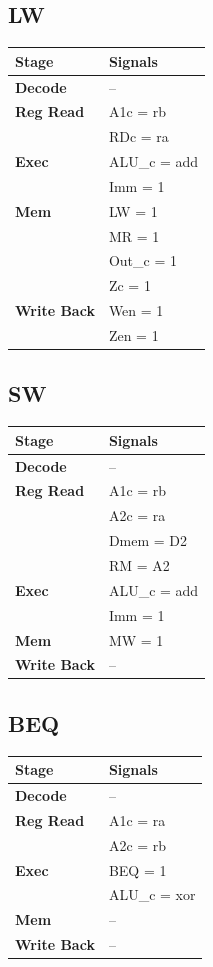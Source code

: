 \documentclass{article}
\begin{document}
\subsection*{LW}
\begin{tabular}{|l|l|}
\hline
\textbf{Stage} & \textbf{Signals}\\
\hline
\textbf{Decode} & --\\
\hline
\textbf{Reg Read} & A1c = rb\\
                  & RDc = ra\\
\hline
\textbf{Exec} & ALU\_c = add\\
              & Imm = 1\\
\hline
\textbf{Mem} & LW = 1\\
             & MR = 1\\
             & Out\_c = 1\\
             & Zc = 1\\
\hline
\textbf{Write Back} & Wen = 1\\
                    & Zen = 1\\
\hline
\end{tabular}

\subsection*{SW}
\begin{tabular}{|l|l|}
\hline
\textbf{Stage} & \textbf{Signals}\\
\hline
\textbf{Decode} & --\\
\hline
\textbf{Reg Read} & A1c = rb\\
                  & A2c = ra\\
                  & Dmem = D2\\
                  & RM = A2\\
\hline
\textbf{Exec} & ALU\_c = add\\
              & Imm = 1\\
\hline
\textbf{Mem} & MW = 1\\
\hline
\textbf{Write Back} & -- \\
\hline
\end{tabular}

\subsection*{BEQ}
\begin{tabular}{|l|l|}
\hline
\textbf{Stage} & \textbf{Signals}\\
\hline
\textbf{Decode} & --\\
\hline
\textbf{Reg Read} & A1c = ra\\
                  & A2c = rb\\
\hline
\textbf{Exec} & BEQ = 1\\
              & ALU\_c = xor\\
\hline
\textbf{Mem} & --\\
\hline
\textbf{Write Back} & --\\
\hline
\end{tabular}
\end{document}
